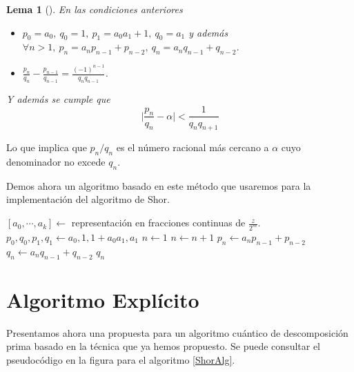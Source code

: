 \documentclass[11pt, spanish]{report}
\makeatletter
\numberwithin{equation}{section}
\newtheorem{lema}[defin]{Lema}
\numberwithin{defin}{section}
\newenvironment{megaalgorithm}[1][htb]{%
    \renewcommand{\ALG@name}{Algoritmo}%
   \begin{algorithm}[#1]%
  }{\end{algorithm}}
\newenvironment{yellowBox}{\begin{tcolorbox}[colback=yellow!5!white,colframe=yellow!75!black]}{\end{tcolorbox}}
\makeatother
\begin{document}
\begin{yellowBox} 
\begin{lema}[\cite{arora2009computational}]En las condiciones anteriores \label{eqFraccionesContinuas}
\begin{itemize}
\item $p_0=a_0,\ q_0=1,\ p_1=a_0a_1+1,\ q_0=a_1$ y además $\forall n>1,\ p_n=a_np_{n-1}+p_{n-2},\ q_n=a_nq_{n-1}+q_{n-2}$. 

\item $\frac{p_n}{q_n}-\frac{p_{n-1}}{q_{n-1}}=\frac{(-1)^{n-1}}{q_nq_{n-1}}$.

\end{itemize}
Y además se cumple que
\begin{equation}\label{eqFracciones}
\Big|\frac{p_n}{q_n}-\alpha\Big|<\frac{1}{q_nq_{n+1}}
\end{equation}
\end{lema}
\end{yellowBox}

Lo que implica que $p_n/q_n$ es el número racional más cercano a $\alpha$ cuyo denominador no excede $q_n$.

Demos ahora un algoritmo basado en este método que usaremos para la implementación del algoritmo de Shor.

\begin{megaalgorithm}[h]
\caption{Algoritmo para hallar el periodo $r$ basado en el método de las fracciones continuas y el lema \ref{eqFraccionesContinuas}.}
\begin{algorithmic}[1]
\State $[a_0,\cdots,a_k]\leftarrow$ representación en fracciones continuas de $\frac{z}{2^m}$.
\State $p_0,q_0,p_1,q_1\leftarrow a_0,1,1+a_0a_1,a_1$
\State $n\leftarrow 1$
\State $n\leftarrow n+1$
\State $p_n\leftarrow a_np_{n-1}+p_{n-2}$
\State $q_n\leftarrow a_nq_{n-1}+q_{n-2}$
\EndWhile
\Return $q_{n}$

\EndProcedure
\end{algorithmic}
\end{megaalgorithm}

\section{Algoritmo Explícito}

Presentamos ahora una propuesta para un algoritmo cuántico de descomposición prima basado en la técnica que ya hemos propuesto. Se puede consultar el pseudocódigo en la figura para el algoritmo \ref{ShorAlg}.\\
\end{document}
